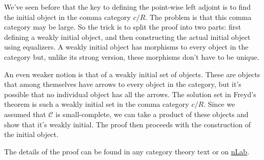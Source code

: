 \documentclass[11pt]{amsart}
\newcommand{\cat}[1]{\mathcal{#1}}
\begin{document}
We've seen before that the key to defining the point-wise left adjoint is to find the initial object in the comma category $c/R$. The problem is that this comma category may be large. So the trick is to split the proof into two parts: first defining a weakly initial object, and then constructing the actual initial object using equalizers. A weakly initial object has morphisms to every object in the category but, unlike its strong version, these morphisms don't have to be unique. 

An even weaker notion is that of a weakly initial set of objects. These are objects that among themselves have arrows to every object in the category, but it's possible that no individual object has all the arrows. The solution set in Freyd's theorem is such a weakly initial set in the comma category $c/R$. Since we assumed that $\cat C$ is small-complete, we can take a product of these objects and show that it's weakly initial. The proof then proceeds with the construction of the initial object. 

The details of the proof can be found in any category theory text or on \href{https://ncatlab.org/nlab/show/adjoint+functor+theorem}{nLab}. 
\end{document}
